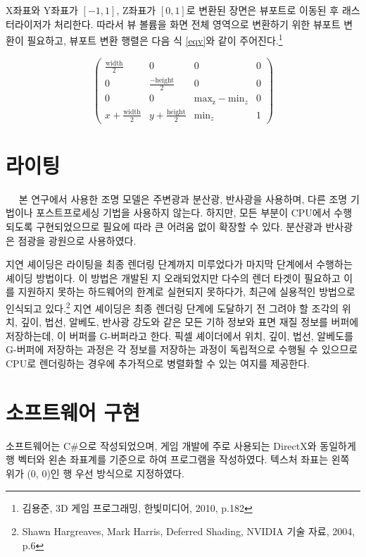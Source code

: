 \documentclass[a4paper,itemph,amsmath,oneside,11pt,openany]{xoblivoir}
\begin{document}
X좌표와 Y좌표가 $[-1, 1]$, Z좌표가 $[0, 1]$로 변환된 장면은 뷰포트로 이동된 후 래스터라이저가 처리한다.
따라서 뷰 볼륨을 화면 전체 영역으로 변환하기 위한 뷰포트 변환이 필요하고, 뷰포트 변환 행렬은 다음 식 \ref{eqv}와 같이 주어진다.\footnote{\cite{kim}김용준, 3D 게임 프로그래밍, 한빛미디어, 2010, p.182}

\begin{equation}
\begin{pmatrix}
\frac{\textrm{width}}{2} & 0 & 0 & 0 \\
0 & \frac{-\textrm{height}}{2} & 0 & 0 \\
0 & 0 & \textrm{max}_\textrm{z} - \textrm{min}_z & 0 \\
x + \frac{\textrm{width}}{2} & y + \frac{\textrm{height}}{2} & \textrm{min}_z & 1
\end{pmatrix}
\label{eqv}
\end{equation}


\section{라이팅}
　 본 연구에서 사용한 조명 모델은 주변광과 분산광, 반사광을 사용하며, 다른 조명 기법이나 포스트프로세싱 기법을 사용하지
않는다. 하지만, 모든 부분이 CPU에서 수행되도록 구현되었으므로 필요에 따라 큰 어려움 없이 확장할 수 있다. 분산광과
반사광은 점광을 광원으로 사용하였다.

지연 셰이딩은 라이팅을 최종 렌더링 단계까지 미루었다가 마지막 단계에서 수행하는 셰이딩 방법이다.
이 방법은 개발된 지 오래되었지만 다수의 렌더 타겟이 필요하고 이를 지원하지 못하는 하드웨어의 한계로 실현되지 못하다가,
최근에 실용적인 방법으로 인식되고 있다.\footnote{\cite{nvidia}Shawn Hargreaves, Mark Harris, Deferred Shading, NVIDIA 기술 자료, 2004, p.6}
지연 셰이딩은 최종 렌더링 단계에 도달하기 전 그려야 할 조각의 위치, 깊이, 법선, 알베도, 반사광 강도와 같은 모든
기하 정보와 표면 재질 정보를 버퍼에 저장하는데, 이 버퍼를 G-버퍼라고 한다. 픽셀 셰이더에서 위치, 깊이, 법선,
알베도를 G-버퍼에 저장하는 과정은 각 정보를 저장하는 과정이 독립적으로 수행될 수 있으므로 CPU로 렌더링하는 경우에
추가적으로 병렬화할 수 있는 여지를 제공한다.

\section{소프트웨어 구현}
소프트웨어는 C\#으로 작성되었으며, 게임 개발에 주로 사용되는 DirectX와 동일하게 행 벡터와 왼손 좌표계를
기준으로 하여 프로그램을 작성하였다. 텍스처 좌표는 왼쪽 위가 (0, 0)인 행 우선 방식으로 지정하였다.
\end{document}
